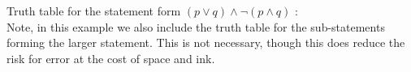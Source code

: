 \guard







\begin{exmp}
\label{exmp:notOrAndTruthTablesCombinations}
  Truth table for the statement form $(p\vee q ) \wedge \neg( p \wedge q )$ : \\
  Note, in this example we also include the truth table for the sub-statements forming the larger statement.
  This is not necessary, though this does reduce the risk for error at the cost of space and ink.
    \begin{center}
      
    \end{center}
\end{exmp}
